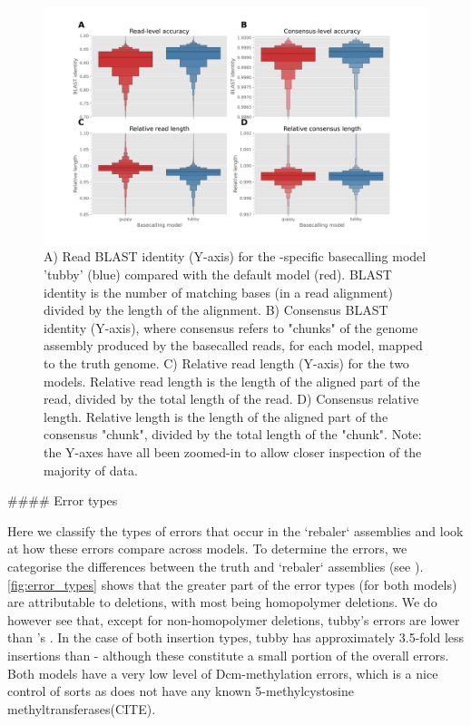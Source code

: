 \begin{figure}
\includegraphics[width=1.0\textwidth]{Chapter4/Figs/combined_identity_relative_len.png}
\centering
\caption{A) Read BLAST identity (Y-axis) for the \mtb{}-specific basecalling model 'tubby' (blue) compared with the default \guppy{} model (red). BLAST identity is the number of matching bases (in a read alignment) divided by the length of the alignment. B) Consensus BLAST identity (Y-axis), where consensus refers to "chunks" of the genome assembly produced by the basecalled reads, for each model, mapped to the truth genome. C) Relative read length (Y-axis) for the two models. Relative read length is the length of the aligned part of the read, divided by the total length of the read. D) Consensus relative length. Relative length is the length of the aligned part of the consensus "chunk", divided by the total length of the "chunk". Note: the Y-axes have all been zoomed-in to allow closer inspection of the majority of data.}
\label{fig:combined_basecall}
\end{figure}

\begin{markdown}

#### Error types

Here we classify the types of errors that occur in the `rebaler` assemblies and look at how these errors compare across models. To determine the errors, we categorise the differences between the truth and `rebaler` assemblies (see ). \autoref{fig:error_types} shows that the greater part of the error types (for both models) are attributable to deletions, with most being homopolymer deletions. We do however see that, except for non-homopolymer deletions, tubby's errors are lower than \guppy{}'s . In the case of both insertion types, tubby has approximately 3.5-fold less insertions than \guppy{} - although these constitute a small portion of the overall errors. Both models have a very low level of Dcm-methylation errors, which is a nice control of sorts as \mtb{} does not have any known 5-methylcystosine methyltransferases(CITE).

\end{markdown}

